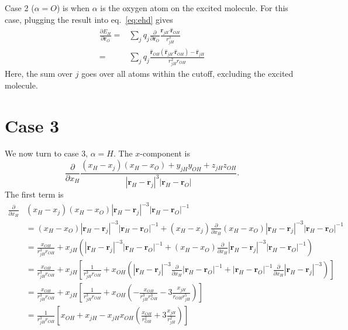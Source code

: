 \documentclass{article}
\newcommand{\vect}[1]{\boldsymbol{\mathbf{#1}}}
\begin{document}
Case 2 ($\alpha=O$) is when $\alpha$ is the oxygen atom on the excited molecule.
For this case, plugging the result into eq.~\ref{eq:ehd} gives
\begin{align}
\frac{\partial E_H}{\partial \vect r_O} =& \sum_j q_j \frac{\partial}{\partial \vect r_O} \frac{\vect{r}_{jH}\vect\cdot\vect{\hat r}_{OH} }{r_{jH}^3} \\
=& \sum_j q_j \frac{ \vect{\hat r}_{OH}(\vect{\hat r}_{jH}\vect\cdot\vect{\hat r}_{OH}) - \vect{\hat r}_{jH}}{r_{jH}^2r_{OH}}
\end{align}
Here, the sum over $j$ goes over all atoms within the cutoff, excluding the excited molecule.

\section{Case 3}
We now turn to case 3, $\alpha=H$.
The $x$-component is
\begin{equation}
\frac{\partial}{\partial x_H} \frac{(x_H-x_j)(x_H-x_O)+y_{jH}y_{OH} + z_{jH}z_{OH}}{|\vect r_H-\vect r_j|^3|\vect r_H-\vect r_O|}. 
\end{equation}
The first term is
\begin{align*}
\frac{\partial}{\partial x_H} &(x_H-x_j)(x_H-x_O)|\vect r_H-\vect r_j|^{-3}|\vect r_H-\vect r_O|^{-1} \\
&=  (x_H-x_O)|\vect r_H-\vect r_j|^{-3}|\vect r_H-\vect r_O|^{-1} + (x_H-x_j)\frac{\partial}{\partial x_H} (x_H-x_O)|\vect r_H-\vect r_j|^{-3}|\vect r_H-\vect r_O|^{-1} \\
&= \frac{x_{OH}}{r_{jH}^3r_{OH}} + x_{jH}\left(|\vect r_H-\vect r_j|^{-3}|\vect r_H-\vect r_O|^{-1} + (x_H-x_O)\frac{\partial}{\partial x_H} |\vect r_H-\vect r_j|^{-3}|\vect r_H-\vect r_O|^{-1}\right)\\
&=  \frac{x_{OH}}{r_{jH}^3r_{OH}} + x_{jH}\left[\frac{1}{r_{jH}^3r_{OH}} + x_{OH}\left(|\vect r_H-\vect r_j|^{-3}\frac{\partial}{\partial x_H} |\vect r_H-\vect r_O|^{-1} + |\vect r_H-\vect r_O|^{-1} \frac{\partial}{\partial x_H}|\vect r_H-\vect r_j|^{-3}\right) \right]\\
&= \frac{x_{OH}}{r_{jH}^3r_{OH}} + x_{jH}\left[\frac{1}{r_{jH}^3r_{OH}} + x_{OH}\left(-\frac{x_{OH}}{r_{jH}^3r_{OH}^3} -3\frac{x_{jH}}{r_{OH}r_{jH}^5}\right) \right]   \\
&= \frac{1}{r_{jH}^3r_{OH}} \left[x_{OH} + x_{jH} - x_{jH} x_{OH}\left(\frac{x_{OH}}{r_{OH}^2} +3\frac{x_{jH}}{r_{jH}^2}\right) \right]  \\
\end{align*}
\end{document}
